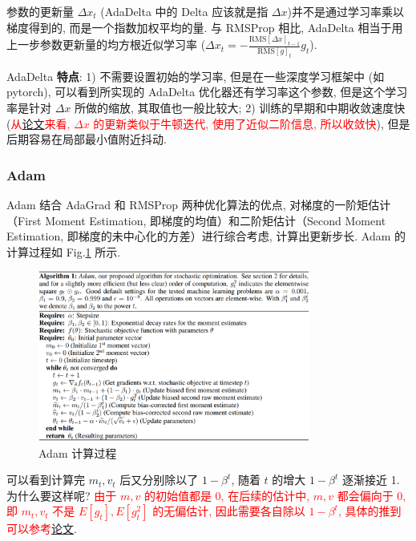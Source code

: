 参数的更新量 $\Delta x_t$ (AdaDelta 中的 Delta 应该就是指 $\Delta x$)并不是通过学习率乘以梯度得到的, 而是一个指数加权平均的量. 与 RMSProp 相比, AdaDelta 相当于用上一步参数更新量的均方根近似学习率 ($\Delta x_t = -\frac{\text{RMS}[\Delta x]_{t-1}}{\text{RMS}[g]_t} g_t$). 

AdaDelta \textbf{特点}: 1) 不需要设置初始的学习率, 但是在一些深度学习框架中 (如 pytorch), 可以看到所实现的 AdaDelta 优化器还有学习率这个参数, 但是这个学习率是针对 $\Delta x$ 所做的缩放, 其取值也一般比较大; 2) 训练的早期和中期收敛速度快 (\textcolor{red}{从\href{https://arxiv.org/pdf/1212.5701.pdf}{论文}来看, $\Delta x$ 的更新类似于牛顿迭代, 使用了近似二阶信息, 所以收敛快}), 但是后期容易在局部最小值附近抖动.

\subsubsection{Adam}
Adam\cite{kingma2015adam} 结合 AdaGrad 和 RMSProp 两种优化算法的优点, 对梯度的一阶矩估计（First Moment  Estimation, 即梯度的均值）和二阶矩估计（Second Moment Estimation, 即梯度的未中心化的方差）进行综合考虑, 计算出更新步长. Adam 的计算过程如 Fig.\ref{fig:adam} 所示. 

\begin{figure}[h]
	\centering
	\includegraphics[width=0.8\textwidth]{pics/adam.png}
	\caption{Adam 计算过程}
	\label{fig:adam}
\end{figure}

可以看到计算完 $m_t, v_t$ 后又分别除以了 $1-\beta^t$, 随着 $t$ 的增大 $1 - \beta^t$ 逐渐接近 1. 为什么要这样呢? \textcolor{red}{由于 $m, v$ 的初始值都是 0, 在后续的估计中, $m, v$ 都会偏向于 0, 即 $m_t, v_t$ 不是 $E[g_t], E[g_t^2]$ 的无偏估计, 因此需要各自除以 $1 - \beta^t$, 具体的推到可以参考\href{https://arxiv.org/pdf/1412.6980.pdf}{论文}}.

